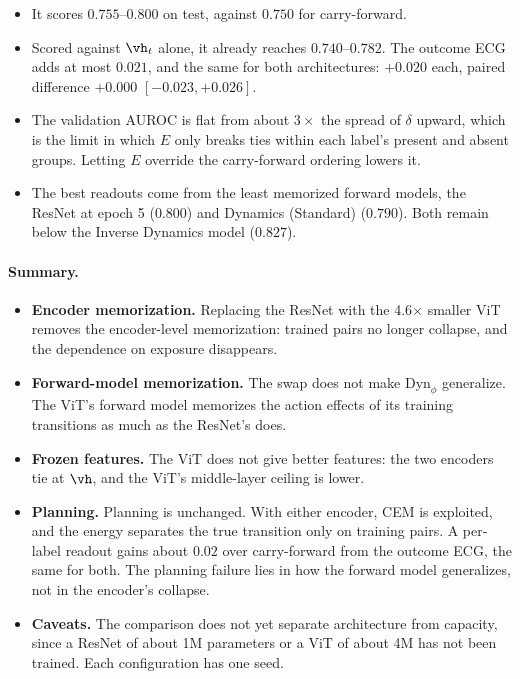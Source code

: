 \begin{itemize}
  \begin{itemize}
  \item It scores $0.755$--$0.800$ on test, against $0.750$ for carry-forward.
  \item Scored against $\vh_t$ alone, it already reaches $0.740$--$0.782$. The outcome ECG adds at most $0.021$, and the same for both architectures: $+0.020$ each, paired difference $+0.000$ $[-0.023, +0.026]$.
  \item The validation AUROC is flat from about $3\times$ the spread of $\delta$ upward, which is the limit in which $E$ only breaks ties within each label's present and absent groups. Letting $E$ override the carry-forward ordering lowers it.
  \item The best readouts come from the least memorized forward models, the ResNet at epoch 5 ($0.800$) and Dynamics (Standard) ($0.790$). Both remain below the Inverse Dynamics model ($0.827$).
  \end{itemize}
\end{itemize}

\paragraph{Summary.}
\begin{itemize}
\item \textbf{Encoder memorization.} Replacing the ResNet with the 4.6$\times$ smaller ViT removes the encoder-level memorization: trained pairs no longer collapse, and the dependence on exposure disappears.
\item \textbf{Forward-model memorization.} The swap does not make $\text{Dyn}_\phi$ generalize. The ViT's forward model memorizes the action effects of its training transitions as much as the ResNet's does.
\item \textbf{Frozen features.} The ViT does not give better features: the two encoders tie at $\vh$, and the ViT's middle-layer ceiling is lower.
\item \textbf{Planning.} Planning is unchanged. With either encoder, CEM is exploited, and the energy separates the true transition only on training pairs. A per-label readout gains about $0.02$ over carry-forward from the outcome ECG, the same for both. The planning failure lies in how the forward model generalizes, not in the encoder's collapse.
\item \textbf{Caveats.} The comparison does not yet separate architecture from capacity, since a ResNet of about 1M parameters or a ViT of about 4M has not been trained. Each configuration has one seed.
\end{itemize}

